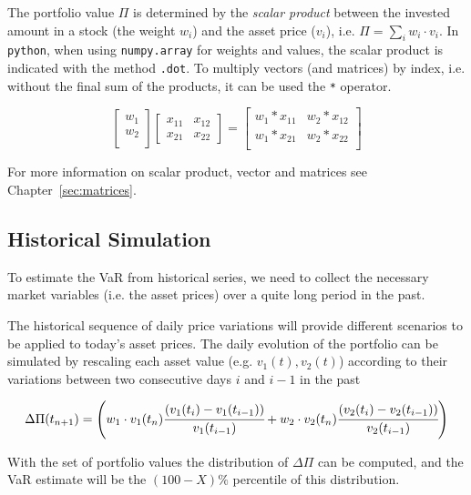 The portfolio value $\Pi$ is determined by the \emph{scalar product} between the invested amount in a stock (the weight $w_i$) and the asset price ($v_i$), i.e. $\Pi = \sum_{i} w_i \cdot v_i$. In \texttt{python}, when using \texttt{numpy.array} for weights and values, the scalar product is indicated with the method \texttt{.dot}.
To multiply vectors (and matrices) by index, i.e. without the final sum of the products, it can be used the \texttt{*} operator.

\begin{equation*}
\begin{bmatrix}
w_1 \\
w_2 \\
\end{bmatrix}
\begin{bmatrix}
x_{11} & x_{12}\\
x_{21} & x_{22}
\end{bmatrix}=
\begin{bmatrix}
w_1*x_{11} & w_2*x_{12}\\
w_1*x_{21} & w_2*x_{22}\\
\end{bmatrix}
\end{equation*}

For more information on scalar product, vector and matrices see Chapter~\ref{sec:matrices}.

\subsection{Historical Simulation}
\label{historical-simulation}

To estimate the VaR from historical series, we need to collect the necessary market variables (i.e. the asset prices) over a quite long period in the past.

The historical sequence of daily price variations will provide different scenarios to be applied to today's asset prices. 
The daily evolution of the portfolio can be simulated by rescaling each asset value (e.g. \(v_1(t), v_2(t)\)) according to their variations between two consecutive days \(i\) and \(i-1\) in the past

\begin{equation}
\Delta\Pi(t_{n+1}) = \left(w_1 \cdot v_1(t_n)\cfrac{(v_1(t_i)-v_1(t_{i-1}))}{v_1(t_{i-1})} + w_2\cdot  v_2(t_n)\cfrac{(v_2(t_i)-v_2(t_{i-1}))}{v_2(t_{i-1})}\right)
\end{equation}

With the set of portfolio values the distribution of $\Delta\Pi$ can be computed, and the VaR estimate will be the $(100 - X)\%$ percentile of this distribution. 

